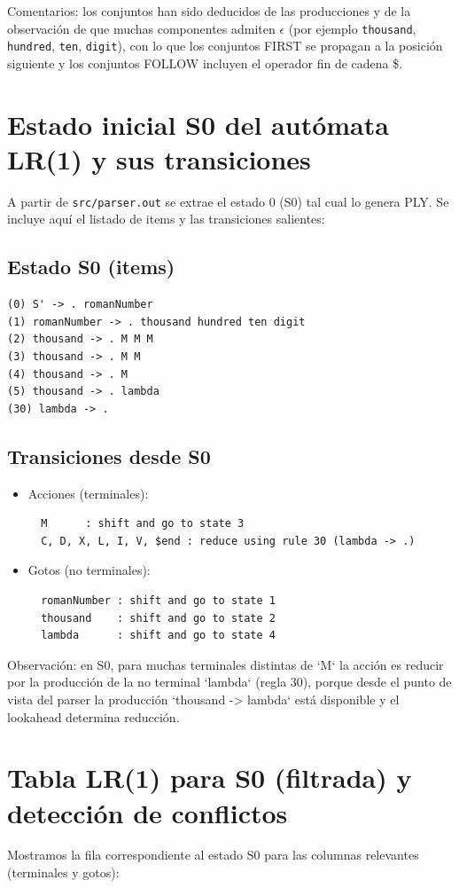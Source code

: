 \documentclass[a4paper,11pt]{article}
\begin{document}
Comentarios: los conjuntos han sido deducidos de las producciones y de la observación de que muchas componentes admiten $\epsilon$ (por ejemplo \texttt{thousand}, \texttt{hundred}, \texttt{ten}, \texttt{digit}), con lo que los conjuntos FIRST se propagan a la posición siguiente y los conjuntos FOLLOW incluyen el operador fin de cadena \$.

\section{Estado inicial S0 del autómata LR(1) y sus transiciones}
A partir de \texttt{src/parser.out} se extrae el estado 0 (S0) tal cual lo genera PLY. Se incluye aquí el listado de items y las transiciones salientes:

\subsection*{Estado S0 (items)}
\begin{verbatim}
(0) S' -> . romanNumber
(1) romanNumber -> . thousand hundred ten digit
(2) thousand -> . M M M
(3) thousand -> . M M
(4) thousand -> . M
(5) thousand -> . lambda
(30) lambda -> .
\end{verbatim}

\subsection*{Transiciones desde S0}
\begin{itemize}
\item Acciones (terminales):
\begin{verbatim}
  M      : shift and go to state 3
  C, D, X, L, I, V, $end : reduce using rule 30 (lambda -> .)
\end{verbatim}
\item Gotos (no terminales):
\begin{verbatim}
  romanNumber : shift and go to state 1
  thousand    : shift and go to state 2
  lambda      : shift and go to state 4
\end{verbatim}
\end{itemize}

Observación: en S0, para muchas terminales distintas de `M` la acción es reducir por la producción de la no terminal `lambda` (regla 30), porque desde el punto de vista del parser la producción `thousand -> lambda` está disponible y el lookahead determina reducción.

\section{Tabla LR(1) para S0 (filtrada) y detección de conflictos}
Mostramos la fila correspondiente al estado S0 para las columnas relevantes (terminales y gotos):
\end{document}
